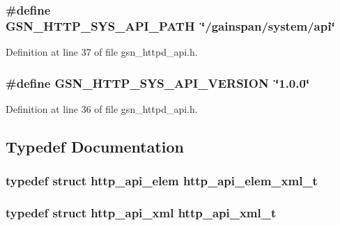 \hypertarget{a00509_af58f9e1e5fd65a1413e6befa3e57a203}{
\subsubsection[{GSN\_\-HTTP\_\-SYS\_\-API\_\-PATH}]{\setlength{\rightskip}{0pt plus 5cm}\#define GSN\_\-HTTP\_\-SYS\_\-API\_\-PATH~\char`\"{}/gainspan/system/api\char`\"{}}}
\label{a00509_af58f9e1e5fd65a1413e6befa3e57a203}


Definition at line 37 of file gsn\_\-httpd\_\-api.h.

\hypertarget{a00509_a5512b1f84d7e1036e19eb3ee62d51359}{
\subsubsection[{GSN\_\-HTTP\_\-SYS\_\-API\_\-VERSION}]{\setlength{\rightskip}{0pt plus 5cm}\#define GSN\_\-HTTP\_\-SYS\_\-API\_\-VERSION~\char`\"{}1.0.0\char`\"{}}}
\label{a00509_a5512b1f84d7e1036e19eb3ee62d51359}


Definition at line 36 of file gsn\_\-httpd\_\-api.h.



\subsection{Typedef Documentation}
\hypertarget{a00509_a29e45f72419d101b2c342187ace40347}{
\subsubsection[{http\_\-api\_\-elem\_\-xml\_\-t}]{\setlength{\rightskip}{0pt plus 5cm}typedef struct {\bf http\_\-api\_\-elem}  {\bf http\_\-api\_\-elem\_\-xml\_\-t}}}
\label{a00509_a29e45f72419d101b2c342187ace40347}
\hypertarget{a00509_aaa9cd32d917ce1d46d4eb48d93dd8414}{
\subsubsection[{http\_\-api\_\-xml\_\-t}]{\setlength{\rightskip}{0pt plus 5cm}typedef struct {\bf http\_\-api\_\-xml}  {\bf http\_\-api\_\-xml\_\-t}}}
\label{a00509_aaa9cd32d917ce1d46d4eb48d93dd8414}


